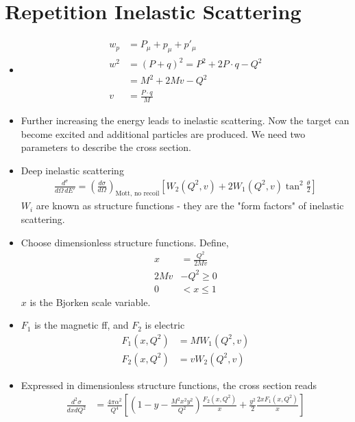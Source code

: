 \documentclass[a4paper, 11pt, normalem]{report}
\begin{document}
\section{Repetition Inelastic Scattering}
\begin{itemize}
    \item 
        \begin{align}
            w_p &= P_\mu + p_\mu + p'_\mu \\
            w^2 &= (P+q)^2 = P^2 + 2P\cdot q - Q^2 \\
                &= M^2 + 2Mv - Q^2 \\
            v &= \frac{P\cdot q}{M}
        \end{align}
    \item Further increasing the energy leads to inelastic scattering.
        Now the target can become excited and additional particles are produced.
        We need two parameters to describe the cross section.
    \item Deep inelastic scattering 
        \begin{align}
            \frac{d^\sigma}{d\Omega\,dE'} = \left(\frac{d\sigma}{d\Omega}\right)_{\text{Mott, no recoil}} \left[W_2(Q^2,v) + 2W_1(Q^2,v)\tan^2\frac{\theta}{2}\right]
        \end{align}
        $W_i$ are known as structure functions - they are the "form factors" of inelastic scattering.
    \item Choose dimensionless structure functions. 
        Define, 
        \begin{align}
            x &= \frac{Q^2}{2Mv} \\
            2Mv &- Q^2 \geq 0 \\
            0 &< x \leq 1
        \end{align}
        $x$ is the Bjorken scale variable. 
    \item $F_1$ is the magnetic ff, and $F_2$ is electric
        \begin{align}
            F_1(x,Q^2) &= MW_1(Q^2,v) \\
            F_2(x,Q^2) &= vW_2(Q^2,v)
        \end{align}
    \item Expressed in dimensionless structure functions, the cross section reads
        \begin{align}
            \frac{d^2\sigma}{dxdQ^2} &= \frac{4\pi\alpha^2}{Q^4}\left[\left(1-y-\frac{M^2x^2y^2}{Q^2}\right)\frac{F_2(x,Q^2)}{x} + \frac{y^2}{2}\frac{2xF_1(x,Q^2)}{x}\right] \\

\end{align}
\end{itemize}
\end{document}
